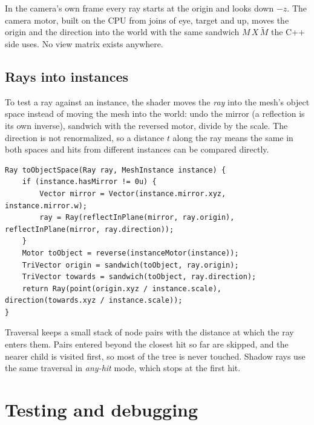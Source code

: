 \documentclass[11pt,a4paper]{article}
\begin{document}
In the camera's own frame every ray starts at the origin and looks down $-z$. The camera motor, built on the CPU from joins of eye, target and up, moves the origin and the direction into the world with the same sandwich $M\,X\,\widetilde{M}$ the C++ side uses. No view matrix exists anywhere.

\subsection{Rays into instances}

To test a ray against an instance, the shader moves the \emph{ray} into the mesh's object space instead of moving the mesh into the world: undo the mirror (a reflection is its own inverse), sandwich with the reversed motor, divide by the scale. The direction is not renormalized, so a distance $t$ along the ray means the same in both spaces and hits from different instances can be compared directly.

\begin{lstlisting}[style=glsl]
Ray toObjectSpace(Ray ray, MeshInstance instance) {
    if (instance.hasMirror != 0u) {
        Vector mirror = Vector(instance.mirror.xyz, instance.mirror.w);
        ray = Ray(reflectInPlane(mirror, ray.origin), reflectInPlane(mirror, ray.direction));
    }
    Motor toObject = reverse(instanceMotor(instance));
    TriVector origin = sandwich(toObject, ray.origin);
    TriVector towards = sandwich(toObject, ray.direction);
    return Ray(point(origin.xyz / instance.scale), direction(towards.xyz / instance.scale));
}
\end{lstlisting}

Traversal keeps a small stack of node pairs with the distance at which the ray enters them. Pairs entered beyond the closest hit so far are skipped, and the nearer child is visited first, so most of the tree is never touched. Shadow rays use the same traversal in \emph{any-hit} mode, which stops at the first hit.

\section{Testing and debugging}
\end{document}
